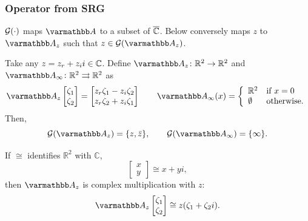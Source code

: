 \documentclass[10pt,mathserif]{beamer}
\begin{document}
\begin{frame}
\frametitle{Operator from SRG}

${\mathcal{G}}(\cdot)$ maps $\opA$ to a subset of $\overline{\mathbb{C}}$.
Below conversely maps $z$ to $\opA_z$ such that $z\in \cG(\opA_z)$.
\setcounter{theorem}{3}
\begin{lemma}
\label{lem:complex-srg}
Take any $z=z_r+z_ii\in \mathbb{C}$. 
Define
$\opA_z\colon\reals^2\rightarrow\reals^2$
and $\opA_\infty\colon\reals^2\rightrightarrows\reals^2$ as
\[
\opA_z\begin{bmatrix}
\zeta_1\\\zeta_2
\end{bmatrix}
=
\begin{bmatrix}
z_r\zeta_1-z_i\zeta_2\\
z_r\zeta_2+z_i\zeta_1
\end{bmatrix}
\qquad
\opA_\infty(x)=\left\{
\begin{array}{ll}
\reals^2&\text{if }x=0\\
\emptyset&\text{otherwise.}
\end{array}
\right.
\]
Then, 
\[
\mathcal{G}(\opA_z)=\{z,\bar{z}\},
\qquad
\mathcal{G}(\opA_\infty)=\{\infty\}.
\]
\end{lemma}
If $\cong$ identifies $\mathbb{R}^2$ with $\mathbb{C}$,
\[
\begin{bmatrix}
x\\y
\end{bmatrix}
\cong x+yi,
\]
then $\opA_z$ is complex multiplication with $z$:
\[
\opA_z\begin{bmatrix}
\zeta_1\\\zeta_2
\end{bmatrix}
\cong z(\zeta_1+\zeta_2i).
\]
\end{frame}
\end{document}
